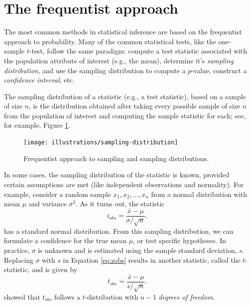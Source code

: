 \documentclass[]{book}
\theoremstyle{definition}
\theoremstyle{definition}
\theoremstyle{definition}
\theoremstyle{remark}
\begin{document}
\hypertarget{the-frequentist-approach}{%
\section{The frequentist approach}\label{the-frequentist-approach}}

The most common methods in statistical inference are based on the
frequentist approach to probability. Many of the common statistical
tests, like the one-sample \(t\)-test, follow the same paradigm: compute
a test statistic associated with the population attribute of interest
(e.g., the mean), determine it's \emph{sampling distribution}, and use
the sampling distribution to compute a \(p\)-value, construct a
\emph{confidence interval}, etc.

The sampling distribution of a statistic (e.g., a test statistic), based
on a sample of size \(n\), is the distribution obtained after taking
every possible sample of size \(n\) from the population of interest and
computing the sample statistic for each; see, for example, Figure
\ref{fig:sampling-distribution}.

\begin{figure}

{\centering \texttt{[image: illustrations/sampling-distribution]} 

}

\caption{Frequentist approach to sampling and sampling distributions.}\label{fig:sampling-distribution}
\end{figure}

In some cases, the sampling distribution of the statistic is known,
provided certain assumptions are met (like independent observations and
normality). For example, consider a random sample
\(x_1, x_2, \dots, x_n\) from a normal distribution with mean \(\mu\)
and variance \(\sigma ^ 2\). As it turns out, the statistic
\begin{equation}
  z_{obs} = \frac{\bar{x} - \mu}{\sigma / \sqrt{n}},
  \label{eq:zobs}
\end{equation} has a standard normal distribution. From this sampling
distribution, we can formulate a confidence for the true mean \(\mu\),
or test specific hypotheses. In practice, \(\sigma\) is unknown and is
estimated using the sample standard deviation, \(s\). Replacing
\(\sigma\) with \(s\) in Equation \eqref{eq:zobs} results in another
statistic, called the \(t\)-statistic, and is given by \begin{equation}
  t_{obs} = \frac{\bar{x} - \mu}{s / \sqrt{n}}.
  \label{eq:tobs}
\end{equation} \citet{student-probable-1908} showed that \(t_{obs}\)
follows a \(t\)-distribution with \(n - 1\) \emph{degrees of freedom}.
\end{document}
